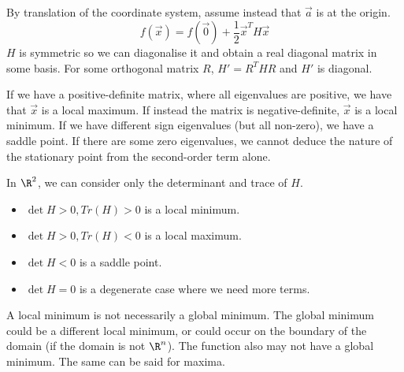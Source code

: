 \documentclass[../Main.tex]{subfiles}
\begin{document}
By translation of the coordinate system, assume instead that $\vec{a}$ is at the origin.
\begin{equation*}
    f(\vec{x}) = f(\vec{0}) + \frac{1}{2} \vec{x}^T H \vec{x}
\end{equation*}
$H$ is symmetric so we can diagonalise it and obtain a real diagonal matrix in some basis. For some orthogonal matrix $R$, $H' = R^T H R$ and $H'$ is diagonal.

If we have a positive-definite matrix, where all eigenvalues are positive, we have that $\vec{x}$ is a local maximum. If instead the matrix is negative-definite, $\vec{x}$ is a local minimum. If we have different sign eigenvalues (but all non-zero), we have a saddle point. If there are some zero eigenvalues, we cannot deduce the nature of the stationary point from the second-order term alone.

In $\R^2$, we can consider only the determinant and trace of $H$.
\begin{itemize}
    \item $\det{H} > 0, Tr(H) > 0$ is a local minimum.
    \item $\det{H} > 0, Tr(H) < 0$ is a local maximum.
    \item $\det{H} < 0$ is a saddle point.
    \item $\det{H} = 0$ is a degenerate case where we need more terms.
\end{itemize}
\begin{remark}
    A local minimum is not necessarily a global minimum. The global minimum could be a different local minimum, or could occur on the boundary of the domain (if the domain is not $\R^n$). The function also may not have a global minimum. The same can be said for maxima.
\end{remark}
\end{document}
